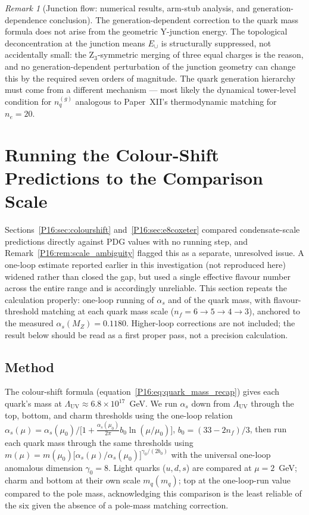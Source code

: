 \documentclass[11pt,a4paper]{article}
\theoremstyle{definition}\newtheorem{definition}[theorem]{Definition}
\theoremstyle{remark}
\newtheorem{remark}[theorem]{Remark}
\theoremstyle{definition}\newtheorem{construction}[theorem]{Construction}
\newcommand{\LUV}{\Lambda_{\mathrm{UV}}}
\begin{document}
\begin{remark}[Junction flow: numerical results, arm-stub analysis, and generation-dependence conclusion]
The generation-dependent correction to the quark mass formula does not
arise from the geometric Y-junction energy.  The topological deconcentration
at the junction means $E_\cup$ is structurally suppressed, not accidentally
small: the Z$_3$-symmetric merging of three equal charges is the reason,
and no generation-dependent perturbation of the junction geometry can
change this by the required seven orders of magnitude.  The quark
generation hierarchy must come from a different mechanism --- most likely
the dynamical tower-level condition for $n_q^{(g)}$ analogous to
Paper~XII's thermodynamic matching for $n_e=20$.
\end{remark}

\section{Running the Colour-Shift Predictions to the Comparison Scale}
\label{P16:sec:rgrunning}

Sections~\ref{P16:sec:colourshift} and~\ref{P16:sec:e8coxeter} compared
condensate-scale predictions directly against PDG values with no
running step, and Remark~\ref{P16:rem:scale_ambiguity} flagged this as a
separate, unresolved issue. A one-loop estimate reported earlier in
this investigation (not reproduced here) widened rather than closed
the gap, but used a single effective flavour number across the entire
range and is accordingly unreliable. This section repeats the
calculation properly: one-loop running of $\alpha_s$ and of the quark
mass, with flavour-threshold matching at each quark mass scale
($n_f=6\to5\to4\to3$), anchored to the measured $\alpha_s(M_Z)=0.1180$.
Higher-loop corrections are not included; the result below should be
read as a first proper pass, not a precision calculation.

\subsection{Method}

The colour-shift formula (equation~\eqref{P16:eq:quark_mass_recap}) gives
each quark's mass at $\LUV\approx6.8\times10^{17}$~GeV. We run
$\alpha_s$ down from $\LUV$ through the top, bottom, and charm
thresholds using the one-loop relation
$\alpha_s(\mu)=\alpha_s(\mu_0)/\bigl[1+\tfrac{\alpha_s(\mu_0)}{2\pi}
b_0\ln(\mu/\mu_0)\bigr]$, $b_0=(33-2n_f)/3$, then run each quark mass
through the same thresholds using
$m(\mu)=m(\mu_0)\bigl[\alpha_s(\mu)/\alpha_s(\mu_0)\bigr]^{\gamma_0/(2b_0)}$
with the universal one-loop anomalous dimension $\gamma_0=8$. Light
quarks ($u,d,s$) are compared at $\mu=2$~GeV; charm and bottom at
their own scale $m_q(m_q)$; top at the one-loop-run value compared to
the pole mass, acknowledging this comparison is the least reliable of
the six given the absence of a pole-mass matching correction.
\end{document}
